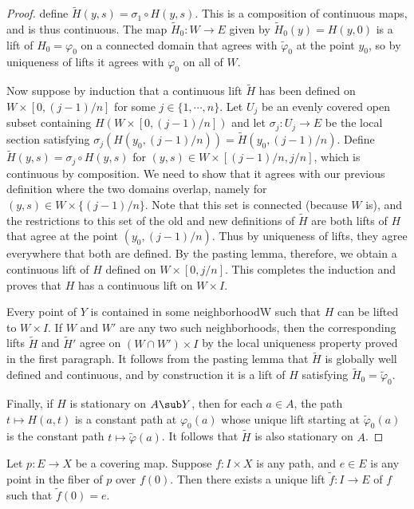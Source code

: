 \begin{proof}
define $\widetilde{H}(y,s)=\sigma_1\circ H(y,s)$. This is a composition of continuous maps, and is thus continuous. The map $\widetilde{H}_0:W\to E$ given by $\widetilde{H}_0(y)=H(y,0)$ is a lift of $H_0=\varphi_0$ on a connected domain that agrees with $\widetilde{\varphi}_0$ at the point $y_0$, so by uniqueness of lifts
it agrees with $\varphi_0$ on all of $W$.\par
Now suppose by induction that a continuous lift $\widetilde{H}$ has been defined on $W\times[0,(j-1)/n]$ for some $j\in\{1,\cdots,n\}$. Let $U_j$ be an evenly covered open subset containing $H(W\times[0,(j-1)/n])$ and let $\sigma_j:U_j\to E$ be the local section satisfying $\sigma_j(H(y_0,(j-1)/n))=\widetilde{H}(y_0,(j-1)/n)$. Define $\widetilde{H}(y,s)=\sigma_j\circ H(y,s)$ for $(y,s)\in W\times[(j-1)/n,j/n]$, which is continuous by composition. We need to show that it agrees with our previous definition where the two domains overlap, namely for $(y,s)\in W\times\{(j-1)/n\}$. Note that this set is connected (because $W$ is), and the restrictions to this set of the old and new definitions of $\widetilde{H}$ are both lifts of $H$ that agree at the point $(y_0,(j-1)/n)$. Thus by uniqueness of lifts, they agree everywhere that both are defined. By the pasting lemma, therefore, we obtain a continuous lift of $H$ defined on $W\times[0,j/n]$. This completes the induction and proves that $H$ has a continuous lift on $W\times I$.\par
Every point of $Y$ is contained in some neighborhoodW such that $H$ can be lifted
to $W\times I$. If $W$ and $W'$ are any two such neighborhoods, then the corresponding lifts $\widetilde{H}$ and $\widetilde{H}'$ agree on $(W\cap W')\times I$ by the local uniqueness property proved in the first paragraph. It follows from the pasting lemma that $\widetilde{H}$ is globally well defined and continuous, and by construction it is a lift of $H$ satisfying $\widetilde{H}_0=\widetilde{\varphi}_0$.\par
Finally, if $H$ is stationary on $A\sub Y$, then for each $a\in A$, the path $t\mapsto H(a,t)$ is a constant path at $\varphi_0(a)$ whose unique lift starting at $\widetilde{\varphi}_0(a)$ is the constant path $t\mapsto\widetilde{\varphi}(a)$. It follows that $\widetilde{H}$ is also stationary on $A$.
\end{proof}
\begin{corollary}\label{path lift}
Let $p:E\to X$ be a covering map. Suppose $f:I\times X$ is any path, and $e\in E$ is any point in the fiber of $p$ over $f(0)$. Then there exists a unique lift $\widetilde{f}:I\to E$ of $f$ such that $\widetilde{f}(0)=e$.
\end{corollary}
